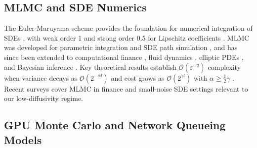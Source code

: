 \documentclass[pdflatex,sn-mathphys-num]{sn-jnl}
\theoremstyle{thmstyleone}%
\theoremstyle{thmstyletwo}%
\theoremstyle{thmstylethree}%
\begin{document}
\subsection{MLMC and SDE Numerics}

The Euler-Maruyama scheme provides the foundation for numerical integration of SDEs
\cite{kloeden1992}, with weak order 1 and strong order 0.5 for Lipschitz coefficients
\cite{khasminskii2012}. MLMC was developed for parametric integration
\cite{heinrich2001multilevel} and SDE path simulation \cite{giles2008multilevel}, and has since
been extended to computational finance \cite{giles2012finance,glasserman2003monte}, fluid
dynamics \cite{mishra2012sparse}, elliptic PDEs \cite{cliffe2015}, and Bayesian inference
\cite{dodwell2015hierarchical}. Key theoretical results establish $\mathcal{O}(\varepsilon^{-2})$
complexity when variance decays as $\mathcal{O}(2^{-\alpha l})$ and cost grows as
$\mathcal{O}(2^{\gamma l})$ with $\alpha \geq \frac{1}{2}\gamma$ \cite{giles2015multilevel}.
Recent surveys cover MLMC in finance \cite{giles2024review} and small-noise SDE settings
\cite{spiliopoulos2022multilevel} relevant to our low-diffusivity regime.

\subsection{GPU Monte Carlo and Network Queueing Models}
\end{document}
